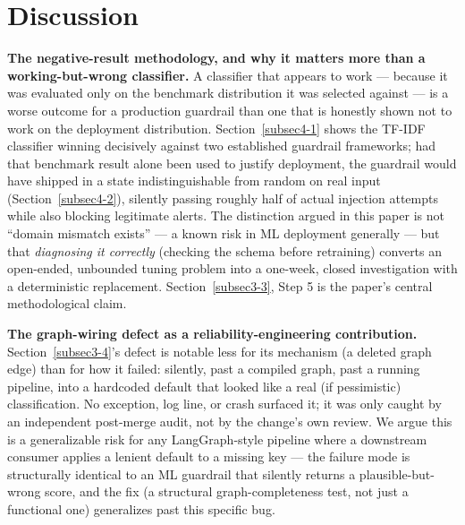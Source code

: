 \documentclass[twocolumn]{svjour3}
\begin{document}
\section{Discussion}\label{sec5}

\noindent\textbf{The negative-result methodology, and why it matters more than a working-but-wrong classifier.} A classifier that appears to work --- because it was evaluated only on the benchmark distribution it was selected against --- is a worse outcome for a production guardrail than one that is honestly shown not to work on the deployment distribution. Section~\ref{subsec4-1} shows the TF-IDF classifier winning decisively against two established guardrail frameworks; had that benchmark result alone been used to justify deployment, the guardrail would have shipped in a state indistinguishable from random on real input (Section~\ref{subsec4-2}), silently passing roughly half of actual injection attempts while also blocking legitimate alerts. The distinction argued in this paper is not ``domain mismatch exists'' --- a known risk in ML deployment generally --- but that \emph{diagnosing it correctly} (checking the schema before retraining) converts an open-ended, unbounded tuning problem into a one-week, closed investigation with a deterministic replacement. Section~\ref{subsec3-3}, Step 5 is the paper's central methodological claim.

\noindent\textbf{The graph-wiring defect as a reliability-engineering contribution.} Section~\ref{subsec3-4}'s defect is notable less for its mechanism (a deleted graph edge) than for how it failed: silently, past a compiled graph, past a running pipeline, into a hardcoded default that looked like a real (if pessimistic) classification. No exception, log line, or crash surfaced it; it was only caught by an independent post-merge audit, not by the change's own review. We argue this is a generalizable risk for any LangGraph-style pipeline where a downstream consumer applies a lenient default to a missing key --- the failure mode is structurally identical to an ML guardrail that silently returns a plausible-but-wrong score, and the fix (a structural graph-completeness test, not just a functional one) generalizes past this specific bug.
\end{document}
